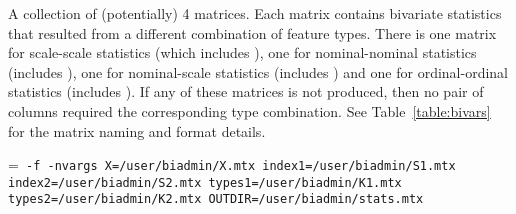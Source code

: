 \smallskip
{}
\smallskip

A collection of (potentially) 4 matrices.  Each matrix contains bivariate statistics that
resulted from a different combination of feature types.  There is one matrix for scale-scale
statistics (which includes \NameStatR), one for nominal-nominal statistics (includes \NameStatChi{}),
one for nominal-scale statistics (includes \NameStatF) and one for ordinal-ordinal statistics
(includes \NameStatRho).  If any of these matrices is not produced, then no pair of columns required
the corresponding type combination.  See Table~\ref{table:bivars} for the matrix naming and
format details.


\smallskip
\pagebreak[2]

\smallskip

{\hangindent=\parindent\noindent\tt
\hml -f \BivarScriptName{} -nvargs
X=/user/biadmin/X.mtx 
index1=/user/biadmin/S1.mtx 
index2=/user/biadmin/S2.mtx 
types1=/user/biadmin/K1.mtx 
types2=/user/biadmin/K2.mtx 
OUTDIR=/user/biadmin/stats.mtx

}

